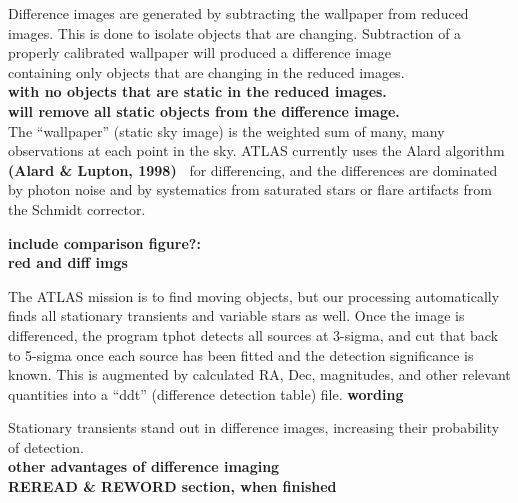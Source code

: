 \documentclass[aps,prb,twocolumn,superscriptaddress]{revtex4-1}
\begin{document}
Difference images are generated by subtracting the wallpaper from reduced 
images. This is done to isolate objects that are changing. Subtraction 
of a properly calibrated wallpaper will produced a difference image \\
containing only objects that are changing in the reduced images.  \\
{\bf with no objects that are static in the reduced images.  }\\
{\bf will remove all static objects from the difference image.  }\\

The ``wallpaper'' (static sky image) is the weighted sum of many, many
observations at each point in the sky.  ATLAS currently uses the
Alard algorithm {\bf (Alard \& Lupton, 1998)~\cite{Alard_algorithm}} for differencing, and the
differences are dominated by photon noise and by systematics from
saturated stars or flare artifacts from the Schmidt corrector.


{\bf\noindent include comparison figure?:\\ \indent red and diff imgs}


The ATLAS mission is to find moving objects, but our processing
automatically finds all stationary transients and variable stars as
well.  Once the image is differenced, the program tphot detects all
sources at 3-sigma, and cut that back to 5-sigma once each source
has been fitted and the detection significance is known.  
This is augmented by calculated RA, Dec, magnitudes, and other relevant
quantities into a ``ddt'' (difference detection table) file.
{\bf wording}



Stationary transients stand out in difference images, increasing their probability of detection.\\
{\bf other advantages of difference imaging\\}
{\bf REREAD \& REWORD section, when finished\\}
\end{document}
